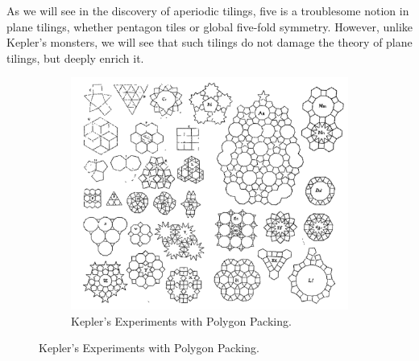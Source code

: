\documentclass[
  oneside,
  11pt, a4paper,
  footinclude=true,
  headinclude=true,
  cleardoublepage=empty
]{scrbook}
\begin{document}
As we will see in the discovery of aperiodic tilings, five is a troublesome notion in plane tilings, whether pentagon tiles or global five-fold symmetry. However, unlike Kepler's monsters, we will see that such tilings do not damage the theory of plane tilings, but deeply enrich it.

\begin{figure}[H]
        \centering
        \begin{subfigure}[b]{0.9\textwidth}
                \includegraphics[width=\textwidth]{KeplersExperiments}
                \caption{Kepler's Experiments with Polygon Packing. \cite{Senechal1996}}
                \label{fig:Experiments}
        \end{subfigure}
        

\end{figure}
\end{document}
